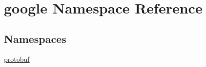 \hypertarget{namespacegoogle}{\section{google Namespace Reference}
\label{namespacegoogle}
}
\subsection*{Namespaces}
\begin{DoxyCompactItemize}
\item 
\hyperlink{namespacegoogle_1_1protobuf}{protobuf}
\end{DoxyCompactItemize}
